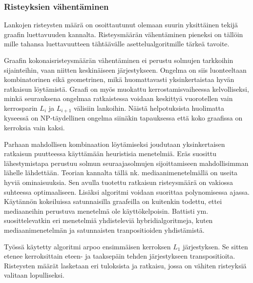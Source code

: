\documentclass[finnish,12pt]{article}
\begin{document}
		\subsubsection{Risteyksien vähentäminen}


Lankojen risteysten määrä on osoittautunut olemaan suurin yksittäinen tekijä graafin luettavuuden kannalta. \cite{RefWorks:47}
Risteysmäärän vähentäminen pieneksi on tällöin mille tahansa luettavuutteen tähtäävälle asettelualgoritmille tärkeä tavoite.

Graafin kokonaisristeysmäärän vähentäminen ei perustu solmujen tarkkoihin sijainteihin, vaan niitten keskinäiseen järjestykseen.
Ongelma on siis luonteeltaan kombinatorinen eikä geometrinen, mikä huomattavasti yksinkertaistaa hyvän ratkaisun löytämistä.
Graafi on myös muokattu kerrostamisvaiheessa kelvolliseksi, minkä seurauksena ongelmaa ratkaistessa voidaan keskittyä vuorotellen vain kerrosparin $L_i$ ja $L_{i+1}$ välisiin lankoihin.
Näistä helpotuksista huolimatta kyseessä on NP-täydellinen ongelma siinäkin tapauksessa että koko graafissa on kerroksia vain kaksi. \cite{RefWorks:40}

Parhaan mahdollisen kombinaation löytämiseksi joudutaan yksinkertaisen ratkaisun puutteessa käyttämään heuristisia menetelmiä.
Eräs suosittu lähestymistapa perustuu solmun seuraajasolmujen sijoittamiseen mahdollisimman lähelle lähdettään.
Teorian kannalta tällä nk. mediaanimenetelmällä on useita hyviä ominaisuuksia.
Sen avulla tuotettu ratkaisun risteysmäärä on vakiossa suhteessa optimaaliseen.
Lisäksi algoritmi voidaan suorittaa polynomisessa ajassa.
Käytännön kokeiluissa satunnaisilla graafeilla on kuitenkin todettu, ettei mediaaneihin perustuva menetelmä ole käyttökelpoisin. \cite{RefWorks:52}
Battisti ym. suosittelevatkin eri menetelmiä yhdisteleviä hybridialgoritmeja, kuten mediaanimenetelmän ja satunnaisten tranpositioiden yhdistämistä\cite{RefWorks:39}.

Työssä käytetty algoritmi arpoo ensimmäisen kerroksen $L_1$ järjestyksen.
Se sitten etenee kerroksittain eteen- ja taaksepäin tehden järjestykseen transpositioita.
Risteysten määrät lasketaan eri tuloksista ja ratkaisu, jossa on vähiten risteyksiä valitaan lopulliseksi.

\end{document}

